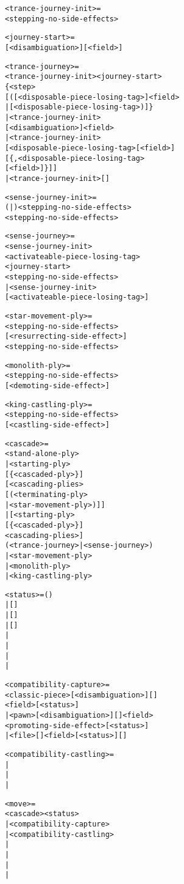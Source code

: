 \begin{alltt}
<trance-journey-init> =
  <stepping-no-side-effects>

<journey-start> =
  [<disambiguation>][\alg{,}<field>]

<trance-journey> =
  <trance-journey-init><journey-start>
  \{<step>
    [(\alg{<}[<disposable-piece-losing-tag>]<field>
      | \alg{*}[<disposable-piece-losing-tag>)]\}
| <trance-journey-init>
    [<disambiguation>]<field>
| <trance-journey-init>
  [<disposable-piece-losing-tag>[<field>]
    [\{,<disposable-piece-losing-tag>
      [<field>]\}]]
| <trance-journey-init>[]

<sense-journey-init> =
  (|)<stepping-no-side-effects>
  <stepping-no-side-effects>

<sense-journey> =
  <sense-journey-init>
  <activateable-piece-losing-tag>
  <journey-start>
  <stepping-no-side-effects>
| <sense-journey-init>
  [<activateable-piece-losing-tag>]
\end{alltt}

\clearpage %

\begin{alltt}
<star-movement-ply> =
  <stepping-no-side-effects>
    [<resurrecting-side-effect>]
    \alg{~}<stepping-no-side-effects>

<monolith-ply> =
  <stepping-no-side-effects>
  [<demoting-side-effect>]

<king-castling-ply> =
  <stepping-no-side-effects>
  [<castling-side-effect>]

<cascade> =
  <stand-alone-ply>
| <starting-ply>
  [\{<cascading-plies>\alg{~}<cascaded-ply>\}]
  [<cascading-plies>
    [\alg{~}(<terminating-ply>
      | <star-movement-ply>)]]
| [<starting-ply>
    [\{<cascading-plies>\alg{~}<cascaded-ply>\}]
    <cascading-plies>\alg{~}]
  (<trance-journey> | <sense-journey>)
| <star-movement-ply>
| <monolith-ply>
| <king-castling-ply>
\end{alltt}

\clearpage %

\begin{alltt}
<status> = ()
         | [\alg{+}]
         | [\alg{+}]\alg{(=)}
         | [\alg{+}]\alg{(-)}
         | \alg{#}
         | \algcty{++}
         | \alg{(=)}
         | \alg{(-)}

<compatibility-capture> =
  <classic-piece>[<disambiguation>][]
    <field>[<status>]
| <pawn>[<disambiguation>][]<field>
    <promoting-side-effect>[<status>]
| <file>[]<field>[<status>][]

<compatibility-castling> =
| 
| 
| 

<move> =
  <cascade><status>
| <compatibility-capture>
| <compatibility-castling>
| \alg{#}
| \alg{##}
| \alg{(==)}
| \alg{(===)}
\end{alltt}

